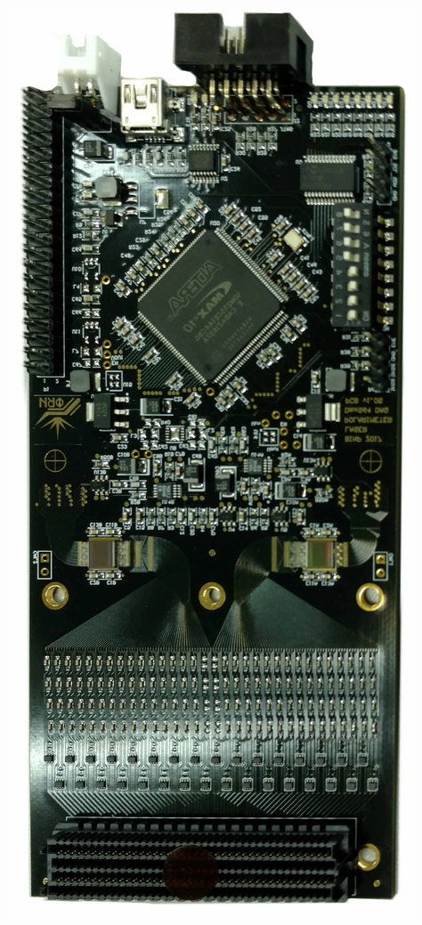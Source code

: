 \documentclass[14pt]{beamer}
\begin{document}
\begin{frame}[c]
\begin{columns}
\begin{minipage}[t][1\textheight]{\linewidth}
		\centering \includegraphics[width=0.5\linewidth]{Readout_board.jpg}
	\end{minipage}
\end{columns}
\end{frame}
\end{document}
